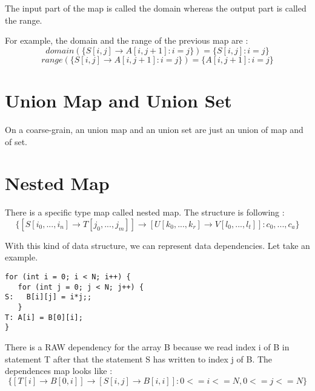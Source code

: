 The input part of the map is called the domain whereas the output part is called the range. 

For example, the domain and the range of the previous map are :
\[
domain(\{S[i,j] \rightarrow A[i,j+1]:i=j\})=\{S[i,j]:i=j\} 
\]
\[
range(\{S[i,j] \rightarrow A[i,j+1]:i=j\})=\{A[i,j+1]:i=j\}
\]

\section{Union Map and Union Set}
On a coarse-grain, an union map and an union set are just an union of map and of set.

\section{Nested Map}
There is a specific type map called nested map. The structure is following : 
\[
\{[S[i_0,...,i_n] \rightarrow T[j_0,...,j_m]] \rightarrow [U[k_0,...,k_r] \rightarrow V[l_0,...,l_t]]:c_0,...,c_a\}
\]

With this kind of data structure, we can represent data dependencies. Let take an example.

\begin{lstlisting}[frame=single]
for (int i = 0; i < N; i++) {
   for (int j = 0; j < N; j++) {
S:   B[i][j] = i*j;;
   }
T: A[i] = B[0][i];
}
\end{lstlisting}

There is a RAW dependency for the array B because we read index i of B in statement T after that the statement S has written to index j of B. The dependences map looks like :
\[
\{[T[i] \rightarrow B[0,i]] \rightarrow [S[i,j] \rightarrow B[i,i]]:0<=i<=N,0<=j<=N\}
\]

